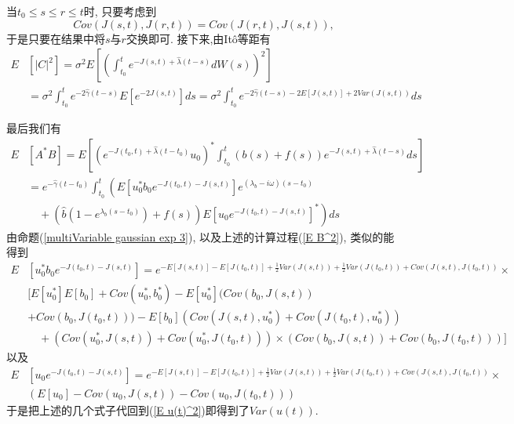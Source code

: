 \documentclass[notitlepage,cs4size,punct,oneside]{ctexrep}
\numberwithin{equation}{section}
\theoremstyle{mystyle}
\begin{document}
当$t_0 \leqslant s \leqslant r \leqslant t$时, 只要考虑到
$$
Cov(J(s, t), J(r, t)) = Cov(J(r, t), J(s, t)),
$$
于是只要在结果中将$s$与$r$交换即可. 接下来,由It\^o等距有
\begin{equation}
\begin{split}
E&\left[|C|^2\right] = \sigma^2E\left[\left(\int_{t_0}^t e^{-J(s, t)+\hat{\lambda}(t-s)}dW(s)\right)^2\right] \\
&= \sigma^2\int_{t_0}^te^{-2\hat\gamma(t-s)}E\left[e^{-2J(s, t)}\right]ds = \sigma^2\int_{t_0}^t e^{-2\hat\gamma(t-s)-2E[J(s, t)]+2Var(J(s, t))}ds
\end{split}
\end{equation}

最后我们有
\begin{equation}
\begin{split}
E&[A^*B] = E\left[\left(e^{-J(t_0, t)+\hat{\lambda}(t-t_0)}u_0\right)^*\int_{t_0}^t(b(s)+f(s))e^{-J(s, t)+\hat{\lambda}(t-s)}ds\right]\\
&= e^{-\hat\gamma(t-t_0)}\int_{t_0}^t \left(E\left[u_0^*b_0e^{-J(t_0, t)-J(s, t)}\right]e^{(\lambda_b-i\omega)(s-t_0)}\right.\\
&\quad+\left.\left(\hat{b}\left(1-e^{\lambda_b(s-t_0)}\right)+f(s)\right)E\left[u_0e^{-J(t_0, t)-J(s, t)}\right]^*\right)ds
\end{split}
\end{equation}
由命题(\ref{multiVariable gaussian exp 3}), 以及上述的计算过程(\ref{E B^2}), 类似的能得到
\begin{equation}
\begin{split}
E&\left[u_0^*b_0e^{-J(t_0, t)-J(s, t)}\right] = e^{-E[J(s, t)]-E[J(t_0, t)]+\frac{1}{2}Var(J(s, t))+\frac{1}{2}Var(J(t_0, t))+Cov(J(s, t), J(t_0, t))}\times \\
&[E[u_0^*]E[b_0]+Cov(u_0^*, b_0^*) - E[u_0^*](Cov(b_0, J(s, t))\\
&+Cov(b_0, J(t_0, t)))-E[b_0](Cov(J(s, t), u_0^*)+Cov(J(t_0, t), u_0^*)) \\
&\quad +(Cov(u_0^*, J(s, t))+Cov(u_0^*, J(t_0, t)))\times(Cov(b_0, J(s, t))+Cov(b_0, J(t_0, t)))]
\end{split}
\end{equation}
以及
\begin{equation}
\begin{split}
E&\left[u_0e^{-J(t_0, t)-J(s, t)}\right] = e^{-E[J(s, t)]-E[J(t_0, t)]+\frac{1}{2}Var(J(s, t))+\frac{1}{2}Var(J(t_0, t))+Cov(J(s, t), J(t_0, t))}\times \\
&(E[u_0]-Cov(u_0, J(s, t))-Cov(u_0, J(t_0, t)))
\end{split}
\end{equation}
于是把上述的几个式子代回到(\ref{E u(t)^2})即得到了$Var(u(t))$.
\end{document}
